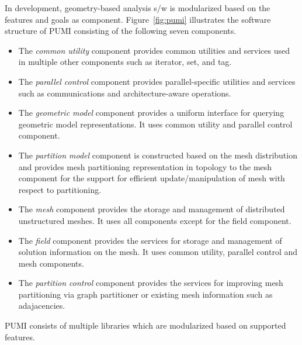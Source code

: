 In development, geometry-based analysis s/w is modularized based on the features and goals as component. Figure~\ref{fig:pumi} illustrates the software structure of PUMI consisting of the following seven components. %
\begin{itemize}
\item The \emph{common utility} component provides common utilities and services used in multiple other components such as iterator, set, and tag.
\item The \emph{parallel control} component provides parallel-specific utilities and services such as communications and architecture-aware operations.
\item The \emph{geometric model} component provides a uniform interface for querying geometric model representations. It uses common utility and parallel control component. 
\item The \emph{partition model} component is constructed based on the mesh distribution and provides mesh partitioning representation in topology to the mesh component for the support for efficient update/manipulation of mesh with respect to partitioning. 
\item The \emph{mesh} component provides the storage and management of distributed unstructured meshes. It uses all components except for  the field component.
\item The \emph{field} component provides the services for storage and management of solution information on the mesh. It uses common utility, parallel control and mesh components.
\item The \emph{partition control} component provides the services for improving mesh partitioning via graph partitioner or existing mesh information such as adajacencies.
\end{itemize}


PUMI consists of multiple libraries which are modularized based on supported features. 

